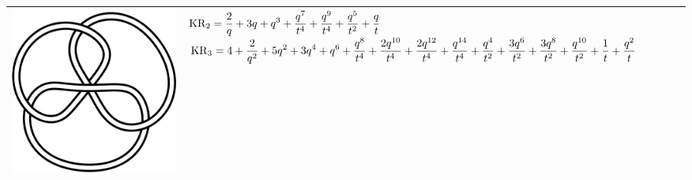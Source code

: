 \documentclass{compositio}
\theoremstyle{definition}
\numberwithin{equation}{section}
\begin{document}
{\begin{longtable}{p{}|p{}}
\includegraphics[scale=0.07,angle=0]{link6_3_3.pdf} 
&
\newline 
$
\displaystyle{%
\KR_{2} = \frac{2}{q}+3 q+q^3+\frac{q^7}{t^4}+\frac{q^9}{t^4}+\frac{q^5}{t^2}+\frac{q}{t}
}
$
\newline 
$
\displaystyle{%
\KR_{3} = 4+\frac{2}{q^2}+5 q^2+3 q^4+q^6+\frac{q^8}{t^4}+\frac{2 q^{10}}{t^4}+\frac{2 q^{12}}{t^4}+\frac{q^{14}}{t^4}+\frac{q^4}{t^2}+\frac{3 q^6}{t^2}+\frac{3 q^8}{t^2}+\frac{q^{10}}{t^2}+\frac{1}{t}+\frac{q^2}{t}
}
$
\newline
\\
\hline
\end{longtable}
}


\newpage
\end{document}
